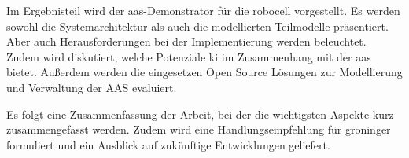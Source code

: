 Im Ergebnisteil wird der \acs{aas}-Demonstrator für die robocell vorgestellt. Es werden sowohl die Systemarchitektur als auch die modellierten Teilmodelle präsentiert.
Aber auch Herausforderungen bei der Implementierung werden beleuchtet.
Zudem wird diskutiert, welche Potenziale \ac{ki} im Zusammenhang mit der \acs{aas} bietet.
Außerdem werden die eingesetzen Open Source Lösungen zur Modellierung und Verwaltung der AAS evaluiert.


Es folgt eine Zusammenfassung der Arbeit, bei der die wichtigsten Aspekte kurz zusammengefasst werden.
Zudem wird eine Handlungsempfehlung für groninger formuliert und ein Ausblick auf zukünftige Entwicklungen geliefert.